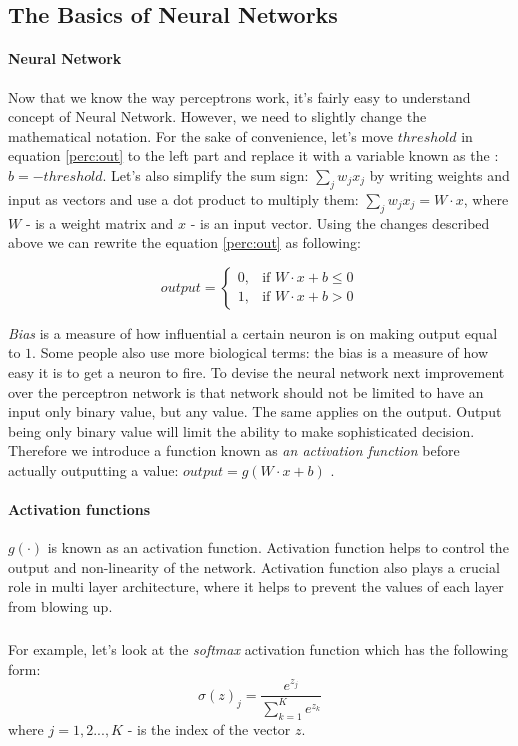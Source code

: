 \subsection{The Basics of Neural Networks}

\paragraph{Neural Network} Now that we know the way perceptrons work,
it's fairly easy to understand concept of Neural Network. However, we need to
slightly change
the mathematical notation. For the sake of convenience, let's move
$threshold$ in equation \ref{perc:out} to the left part and replace it
with a variable known as the  : $b = -threshold$. Let's also simplify
the sum sign: $\sum_j w_j x_j$ by writing weights and input as vectors and use a dot product
to multiply them:
$\sum_j w_j x_j = W \cdot x$, where $W$ - is a weight matrix and $x$ - is an input vector.
Using the changes described above we can rewrite the
equation \ref{perc:out} as following:

\begin{equation} \label{perc:with_bias}
	output = \begin{cases} 0, & \mbox{if } W \cdot x + b\leq 0 \\ 1, & \mbox{if } W \cdot x + b > 0 \end{cases}
\end{equation}

\emph{Bias} is a measure of how influential a certain neuron is on making output equal to $1$.
Some people also use more biological terms: the bias is a measure of how easy it is
to get a neuron to fire. To devise the neural network
next improvement over the perceptron network is that network should not be limited
to have an input only binary value, but any value. The same applies on the output.
Output being only binary value will limit the ability to make sophisticated decision.
Therefore we introduce a function known as \emph{an activation function} before
actually outputting a value: $output = g( W \cdot x + b)$ \cite{Nielsen2015} .

\paragraph{Activation functions} $g(\cdot)$ is known as an activation function.
Activation function helps to control the output and non-linearity of the network.
Activation function also plays a crucial role in multi layer architecture, where it helps
to prevent the values of each layer from blowing up.
\subparagraph{}
For example, let's look at the \emph{softmax} activation function which has
the following form:
\begin{equation} \label{sigmoid_function}
	\sigma(z)_j = \frac{e^{z_j}}{\sum_{k=1}^K e^{z_k}}
\end{equation}
where $j = 1,2 ..., K$ - is the index of the vector $z$.



